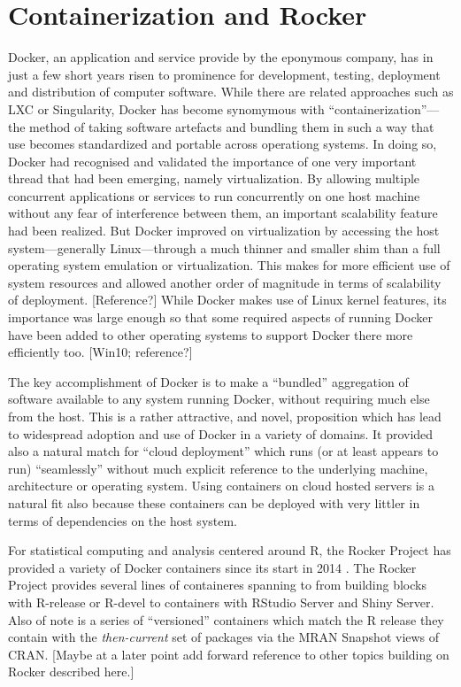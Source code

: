 \hypertarget{containerization-and-rocker}{%
\section{Containerization and
Rocker}\label{containerization-and-rocker}}

Docker, an application and service provide by the eponymous company, has
in just a few short years risen to prominence for development, testing,
deployment and distribution of computer software. While there are
related approaches such as LXC or Singularity, Docker has become
synomymous with ``containerization''---the method of taking software
artefacts and bundling them in such a way that use becomes standardized
and portable across operationg systems. In doing so, Docker had
recognised and validated the importance of one very important thread
that had been emerging, namely virtualization. By allowing multiple
concurrent applications or services to run concurrently on one host
machine without any fear of interference between them, an important
scalability feature had been realized. But Docker improved on
virtualization by accessing the host system---generally Linux---through
a much thinner and smaller shim than a full operating system emulation
or virtualization. This makes for more efficient use of system resources
and allowed another order of magnitude in terms of scalability of
deployment. {[}Reference?{]} While Docker makes use of Linux kernel
features, its importance was large enough so that some required aspects
of running Docker have been added to other operating systems to support
Docker there more efficiently too. {[}Win10; reference?{]}

The key accomplishment of Docker is to make a ``bundled'' aggregation of
software available to any system running Docker, without requiring much
else from the host. This is a rather attractive, and novel, proposition
which has lead to widespread adoption and use of Docker in a variety of
domains. It provided also a natural match for ``cloud deployment'' which
runs (or at least appears to run) ``seamlessly'' without much explicit
reference to the underlying machine, architecture or operating system.
Using containers on cloud hosted servers is a natural fit also because
these containers can be deployed with very littler in terms of
dependencies on the host system.

For statistical computing and analysis centered around R, the Rocker
Project has provided a variety of Docker containers since its start in
2014 \citep{RJ-2017-065}. The Rocker Project provides several lines of
containeres spanning to from building blocks with R-release or R-devel
to containers with RStudio Server and Shiny Server. Also of note is a
series of ``versioned'' containers which match the R release they
contain with the \emph{then-current} set of packages via the MRAN
Snapshot views of CRAN. {[}Maybe at a later point add forward reference
to other topics building on Rocker described here.{]}

